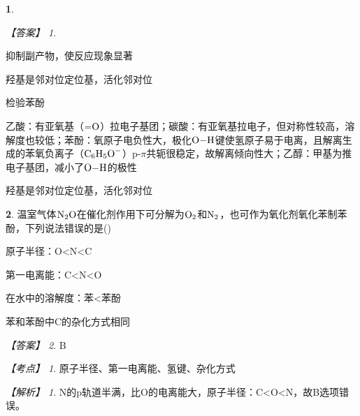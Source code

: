 \documentclass[UTF8, 10pt, a4paper, oneside]{ctexart}
\newcommand{\fs}[1]{{\fangsong #1}}%
\theoremstyle{definition}
\newtheorem{subexercise}{}[exercise]%
\theoremstyle{remark}
\newtheorem*{answer}{【答案】}
\newtheorem*{point}{【考点】}      %
\newtheorem*{explanation}{【解析】}     %
\theoremstyle{plain}
\begin{document}
\begin{subexercise}
\begin{answer}
\begin{inparaenum}
            \item 抑制副产物，使反应现象显著
            \item 羟基是邻对位定位基，活化邻对位
            \item 检验苯酚
            \item 乙酸：有亚氧基（$\ce{=O}$）拉电子基团；碳酸：有亚氧基拉电子，但对称性较高，溶解度也较低；苯酚：氧原子电负性大，极化$\ce{O-H}$键使氢原子易于电离，且解离生成的苯氧负离子（$\ce{C6H5O-}$）p-$\pi$共轭很稳定，故解离倾向性大；乙醇：甲基为推电子基团，减小了$\ce{O-H}$的极性
            \item 羟基是邻对位定位基，活化邻对位
        \end{inparaenum}
    \end{answer}
\end{subexercise}
\begin{subexercise}
    \fs{[2024甘肃卷]}温室气体$\ce{N2O}$在催化剂作用下可分解为$\ce{O2}$和$\ce{N2}$，也可作为氧化剂氧化苯制苯酚，下列说法错误的是\quad(\quad)
    \begin{adjustwidth}{4em}{}
        \begin{asparaenum}[A. ]
            \item 原子半径：O<N<C
            \item 第一电离能：C<N<O
            \item 在水中的溶解度：苯<苯酚
            \item 苯和苯酚中C的杂化方式相同
        \end{asparaenum}
    \end{adjustwidth}
    \begin{answer}
        B
    \end{answer}
    \begin{point}
        原子半径、第一电离能、氢键、杂化方式
    \end{point}
    \begin{explanation}
        N的p轨道半满，比O的电离能大，原子半径：C<O<N，故B选项错误。
    \end{explanation}
\end{subexercise}
\end{document}
